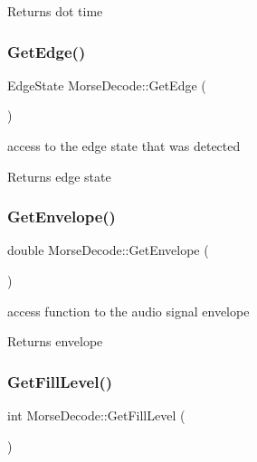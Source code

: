 \begin{DoxyReturn}{Returns}
dot time 
\end{DoxyReturn}
\mbox{\label{classMorseDecode_a92f19fd07b401876cf132f5f134f2788}} 
\subsubsection{\texorpdfstring{Get\+Edge()}{GetEdge()}}
{\footnotesize\ttfamily Edge\+State Morse\+Decode\+::\+Get\+Edge (\begin{DoxyParamCaption}{ }\end{DoxyParamCaption})}



access to the edge state that was detected 

\begin{DoxyReturn}{Returns}
edge state 
\end{DoxyReturn}
\mbox{\label{classMorseDecode_adc01798960f0f74071eaac3516a4b523}} 
\subsubsection{\texorpdfstring{Get\+Envelope()}{GetEnvelope()}}
{\footnotesize\ttfamily double Morse\+Decode\+::\+Get\+Envelope (\begin{DoxyParamCaption}{ }\end{DoxyParamCaption})}



access function to the audio signal envelope 

\begin{DoxyReturn}{Returns}
envelope 
\end{DoxyReturn}
\mbox{\label{classMorseDecode_a716a68423027190d97a59f74aba2f8b3}} 
\subsubsection{\texorpdfstring{Get\+Fill\+Level()}{GetFillLevel()}}
{\footnotesize\ttfamily int Morse\+Decode\+::\+Get\+Fill\+Level (\begin{DoxyParamCaption}{ }\end{DoxyParamCaption})}



